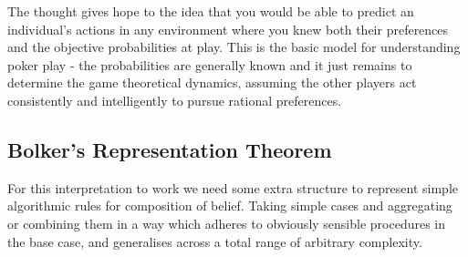 \documentclass[
]{book}
\theoremstyle{definition}
\theoremstyle{definition}
\theoremstyle{definition}
\theoremstyle{remark}
\begin{document}
The thought gives hope to the idea that you would be able to predict an individual's actions in any environment where you knew both their preferences and the objective probabilities at play. This is the basic model for understanding poker play - the probabilities are generally known and it just remains to determine the game theoretical dynamics, assuming the other players act consistently and intelligently to pursue rational preferences.

\hypertarget{bolkers-representation-theorem}{%
\subsection{Bolker's Representation Theorem}\label{bolkers-representation-theorem}}

For this interpretation to work we need some extra structure to represent simple algorithmic rules for composition of belief. Taking simple cases and aggregating or combining them in a way which adheres to obviously sensible procedures in the base case, and generalises across a total range of arbitrary complexity.
\end{document}
